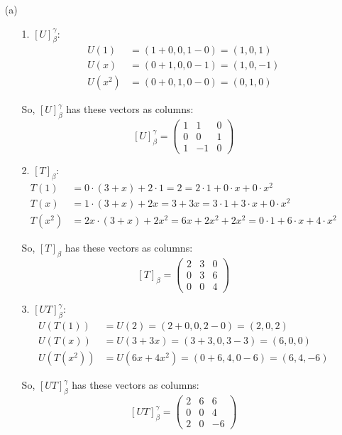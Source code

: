 \documentclass{article}
\begin{document}
\begin{enumerate}
\item[(a)] 

\begin{enumerate}
\item[1.] $[U]_{\beta}^{\gamma}$:
\begin{align*}
U(1) &= (1+0, 0, 1-0) = (1, 0, 1) \\
U(x) &= (0+1, 0, 0-1) = (1, 0, -1) \\
U(x^2) &= (0+0, 1, 0-0) = (0, 1, 0)
\end{align*}

So, $[U]_{\beta}^{\gamma}$ has these vectors as columns:
$$[U]_{\beta}^{\gamma} = 
\begin{pmatrix}
1 & 1 & 0 \\
0 & 0 & 1 \\
1 & -1 & 0
\end{pmatrix}$$

\item[2.] $[T]_{\beta}$:
\begin{align*}
T(1) &= 0 \cdot (3+x) + 2 \cdot 1 = 2 = 2 \cdot 1 + 0 \cdot x + 0 \cdot x^2 \\
T(x) &= 1 \cdot (3+x) + 2x = 3 + 3x = 3 \cdot 1 + 3 \cdot x + 0 \cdot x^2 \\
T(x^2) &= 2x \cdot (3+x) + 2x^2 = 6x + 2x^2 + 2x^2 = 0 \cdot 1 + 6 \cdot x + 4 \cdot x^2
\end{align*}

So, $[T]_{\beta}$ has these vectors as columns:
$$[T]_{\beta} = 
\begin{pmatrix}
2 & 3 & 0 \\
0 & 3 & 6 \\
0 & 0 & 4
\end{pmatrix}$$

\item[3.] $[UT]_{\beta}^{\gamma}$:
\begin{align*}
U(T(1)) &= U(2) = (2+0, 0, 2-0) = (2, 0, 2) \\
U(T(x)) &= U(3+3x) = (3+3, 0, 3-3) = (6, 0, 0) \\
U(T(x^2)) &= U(6x+4x^2) = (0+6, 4, 0-6) = (6, 4, -6)
\end{align*}

So, $[UT]_{\beta}^{\gamma}$ has these vectors as columns:
$$[UT]_{\beta}^{\gamma} = 
\begin{pmatrix}
2 & 6 & 6 \\
0 & 0 & 4 \\
2 & 0 & -6
\end{pmatrix}$$


\end{enumerate}
\end{enumerate}
\end{document}
